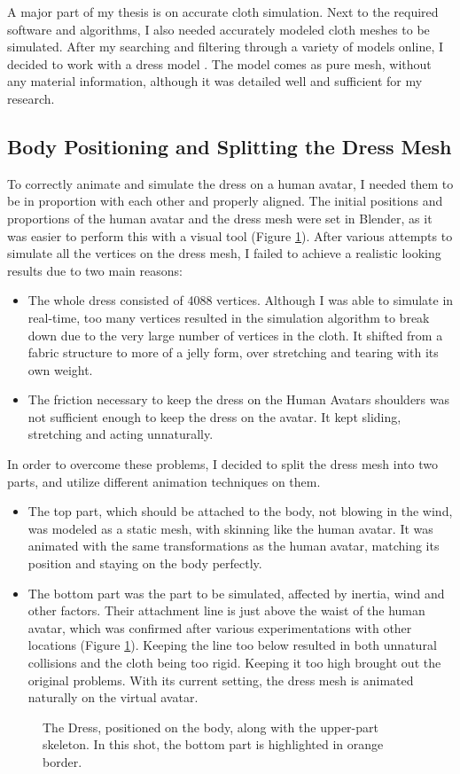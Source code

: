 A major part of my thesis is on accurate cloth simulation. Next to the required software and algorithms, I also needed accurately modeled cloth meshes to be simulated. After my searching and filtering through a variety of models online, I decided to work with a dress model \cite{LadyJewell2012}. The model comes as pure mesh, without any material information, although it was detailed well and sufficient for my research.

\subsection{Body Positioning and Splitting the Dress Mesh}

To correctly animate and simulate the dress on a human avatar, I needed them to be in proportion with each other and properly aligned. The initial positions and proportions of the human avatar and the dress mesh were set in Blender, as it was easier to perform this with a visual tool (Figure \ref{fig:dress_and_body}).
After various attempts to simulate all the vertices on the dress mesh, I failed to achieve a realistic looking results due to two main reasons:
\begin{itemize}
  \item The whole dress consisted of 4088 vertices. Although I was able to simulate in real-time, too many vertices resulted in the simulation algorithm to break down due to the very large number of vertices in the cloth. It shifted from a fabric structure to more of a jelly form, over stretching and tearing with its own weight.
  \item The friction necessary to keep the dress on the Human Avatars shoulders was not sufficient enough to keep the dress on the avatar. It kept sliding, stretching and acting unnaturally.
\end{itemize}

In order to overcome these problems, I decided to split the dress mesh into two parts, and utilize different animation techniques on them.

\begin{itemize}
  \item The top part, which should be attached to the body, not blowing in the wind, was modeled as a static mesh, with skinning like the human avatar. It was animated with the same transformations as the human avatar, matching its position and staying on the body perfectly.
  \item The bottom part was the part to be simulated, affected by inertia, wind and other factors. Their attachment line is just above the waist of the human avatar, which was confirmed after various experimentations with other locations (Figure \ref{fig:dress_and_body}). Keeping the line too below resulted in both unnatural collisions and the cloth being too rigid. Keeping it too high brought out the original problems. With its current setting, the dress mesh is animated naturally on the virtual avatar.
\end{itemize}

\begin{figure}[h]
\centerline{}
\caption{The  Dress, positioned on the body, along with the upper-part skeleton. In this shot, the bottom part is highlighted in orange border.}
\label{fig:dress_and_body}
\end{figure}

